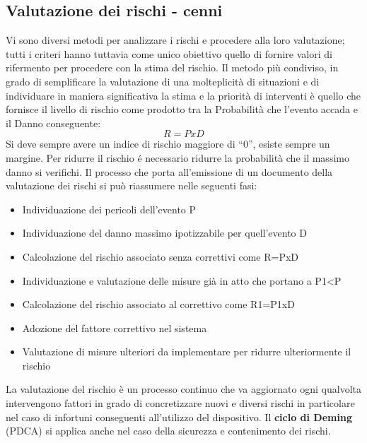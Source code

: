 \documentclass[a4paper]{article}
\begin{document}
\subsection{Valutazione dei rischi - cenni}
Vi sono diversi metodi per analizzare i rischi e procedere alla loro valutazione; tutti i criteri hanno tuttavia come
unico obiettivo quello di fornire valori di rifermento per procedere con la stima del rischio.
Il metodo più condiviso, in grado di semplificare la valutazione di una molteplicità di situazioni e di individuare in
maniera significativa la stima e la priorità di interventi è quello che fornisce il livello di rischio come prodotto tra
la Probabilità che l’evento accada e il Danno conseguente:$$R=PxD$$
Si deve sempre avere un indice di rischio maggiore di “0”, esiste sempre un margine.\newline
Per ridurre il rischio é necessario ridurre la probabilità che il massimo danno si verifichi.  
Il processo che porta all'emissione di un documento della valutazione dei rischi si può riassumere nelle seguenti fasi:
\begin{itemize}
    \item Individuazione dei pericoli dell’evento P
    \item Individuazione del danno massimo ipotizzabile per quell’evento D
    \item Calcolazione del rischio associato senza correttivi come R=PxD
    \item Individuazione e valutazione delle misure già in atto che portano a P1<P
    \item Calcolazione del rischio associato al correttivo come R1=P1xD
    \item Adozione del fattore correttivo nel sistema
    \item Valutazione di misure ulteriori da implementare per ridurre ulteriormente il rischio 
\end{itemize}
La valutazione del rischio è un processo continuo che va aggiornato ogni qualvolta intervengono fattori in grado
di concretizzare nuovi e diversi rischi in particolare nel caso di infortuni conseguenti all’utilizzo del dispositivo. \newline
Il \textbf{ciclo di Deming} (PDCA) si applica anche nel caso della sicurezza e contenimento dei rischi.
\end{document}
